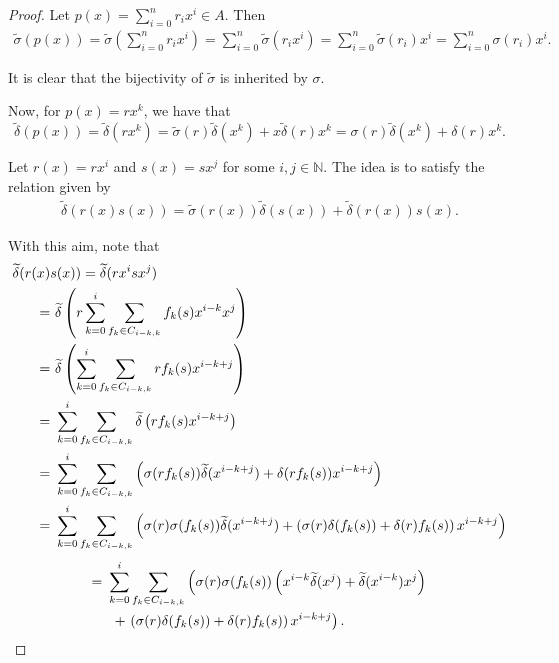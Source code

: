 \documentclass{amsart}
\theoremstyle{definition}
\theoremstyle{remark}
\numberwithin{equation}{section}
\begin{document}
\begin{proof}
    Let $p(x) = \sum\limits_{i=0}^n r_i x^i \in A $. Then
    \begin{align*}
        \widetilde{\sigma}(p(x)) = \widetilde{\sigma} \left(\sum_{i=0}^n r_i x^i\right) = \sum_{i=0}^n \widetilde{\sigma}(r_i x^i) = \sum_{i=0}^n\widetilde{\sigma} (r_i) x^i = \sum_{i=0}^n\sigma(r_i) x^i.
    \end{align*}
    
It is clear that the bijectivity of $\widetilde{\sigma}$ is inherited by $\sigma$.

Now, for $p(x) = r x^k$, we have that
\begin{equation*}
    \widetilde{\delta} (p(x)) = \widetilde{\delta}(r x^k) = \widetilde{\sigma}(r)\widetilde{\delta} (x^k) +x  \widetilde{\delta}(r) x^k = \sigma(r)\widetilde{\delta}(x^k) + \delta(r) x^k.
\end{equation*}

Let $r(x) = r x^i$ and $s(x) = s x^j$ for some $i,j \in \mathbb{N}$. The idea is to satisfy the relation given by
\begin{align*}
    \widetilde{\delta} (r(x) s(x)) = \widetilde{\sigma} (r(x)) \widetilde{\delta}(s(x)) + \widetilde{\delta} (r(x)) s(x).
\end{align*}

With this aim, note that 
\begin{align}
    \widetilde{\delta}(r(x) & s(x)) = \widetilde{\delta}(r x^is x^j) \notag \\ 
    = &\ \widetilde{\delta}\left(r\sum_{k=0}^{i}\sum_{f_k\in C_{i-k,k}}f_k(s) x^{i-k} x^j\right) \notag \\
     = &\ \widetilde{\delta}\left(\sum_{k=0}^{i}\sum_{f_k\in C_{i-k,k}} r f_k(s) x^{i-k+j}\right) \notag \\ 
     = &\ \sum_{k=0}^{i}\sum_{f_k\in C_{i-k,k}}\widetilde{\delta}\left(rf_k(s) x^{i-k+j}\right) \notag \\
     = &\ \sum_{k=0}^{i}\sum_{f_k\in C_{i-k,k}}\left(\sigma(rf_k(s))\widetilde{\delta} (x^{i-k+j}) + \delta(rf_k(s)) x^{i-k+j}\right) \notag \\
     = &\ \sum_{k=0}^{i}\sum_{f_k\in C_{i-k,k}}\left(\sigma(r)\sigma(f_k(s))\widetilde{\delta}(x^{i-k+j})+\left(\sigma(r)\delta(f_k(s))+\delta(r)f_k(s)\right) x^{i-k+j}\right) \notag 
     \end{align}
    \begin{align} 
     = &\ \sum_{k=0}^{i} \sum_{f_k\in C_{i-k,k}} \left(\sigma(r)\sigma(f_k(s))\left(x^{i-k}\widetilde{\delta}(x^j) + \widetilde{\delta}(x^{i-k}) x^j\right) \right. \notag \\
     &\ \ + \left. \left(\sigma(r)\delta(f_k(s)) + \delta(r)f_k(s)\right) x^{i-k+j} \right). \label{First24}
\end{align}


\end{proof}
\end{document}
